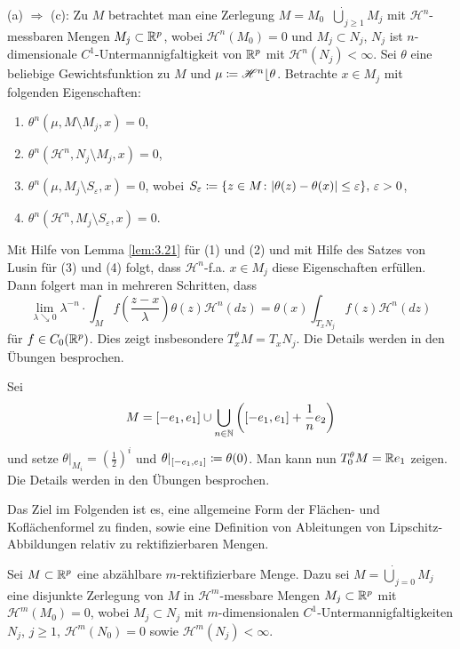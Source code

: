 \documentclass[a4paper,twoside,DIV15,BCOR12mm]{scrbook}
\newcommand{\HM}{\mathscr H}
\DeclareMathOperator{\downto}{\searrow}
\newcommand{\MR}{\lfloor}
\begin{document}
\begin{beweis}[Skizze]
(a) \(\Rightarrow\) (c): Zu \(M\) betrachtet man eine Zerlegung \(M = M_0 \mathop{\dot\cup} {\dot\bigcup}_{j\geq1} M_j\) mit \(\HM^n\)-messbaren Mengen \(M_j \subset \mathbb{R}^p\), wobei \(\HM^n(M_0)=0\) und \(M_j\subset N_j\), \(N_j\) ist \(n\)-dimensionale \(C^1\)-Unter\-mannig\-faltig\-keit von \(\mathbb{R}^p\) mit \(\HM^n(N_j)<\infty\). Sei \(\theta\) eine beliebige Gewichtsfunktion zu \(M\) und \(\mu \da \HM^n \MR \theta\). Betrachte \(x\in M_j\) mit folgenden Eigenschaften:
\begin{enumerate}[(1)]
\item \(\theta^n(\mu, M\setminus M_j, x)=0\),
\item \(\theta^n(\HM^n, N_j \setminus M_j, x) = 0\),
\item \(\theta^n(\mu, M_j \setminus S_\varepsilon, x) = 0\), wobei \(S_\varepsilon \da \{z\in M \colon |\theta(z)-\theta(x)|\leq\varepsilon\},\, \varepsilon>0\),
\item \(\theta^n(\HM^n, M_j\setminus S_\varepsilon, x)=0\).
\end{enumerate}
Mit Hilfe von Lemma \ref{lem:3.21} für (1) und (2) und mit Hilfe des Satzes von Lusin für (3) und (4) folgt, dass \(\HM^n\)-f.a. \(x\in M_j\) diese Eigenschaften erfüllen. Dann folgert man in mehreren Schritten, dass
\[
\lim_{\lambda\downto0} \lambda^{-n} \cdot \int_M f(\frac{z-x}\lambda) \theta(z) \HM^n(dz) = \theta(x) \int_{T_x N_j} f(z) \HM^n(dz)
\]
für \(f \in C_0(\mathbb{R}^p)\). Dies zeigt insbesondere \(T_x^\theta M = T_x N_j\). Die Details werden in den Übungen 
besprochen.
\end{beweis}

\begin{beispiel} Sei
\[M = [-e_1, e_1] \cup \bigcup_{n \in \mathbb{N}} \left( [-e_1, e_1] + \frac1n e_2 \right)
\] und setze \(\theta|_{M_i} = \left(\frac12\right)^i\) und \(\theta|_{[-e_1,e_1]} \da \theta(0)\). Man kann nun \(T_0^\theta M = \mathbb{R} e_1\) zeigen.  Die Details werden in den Übungen besprochen.
\end{beispiel}

\bigskip

Das Ziel im Folgenden ist es, eine allgemeine Form der Flächen- und Koflächenformel zu finden, sowie eine Definition von Ableitungen von Lipschitz-Abbildungen relativ zu rektifizierbaren Mengen.

Sei $M\subset \mathbb{R}^p$ eine abzählbare $m$-rektifizierbare Menge. Dazu sei $M = \dot\bigcup_{j=0} M_j$ eine  disjunkte Zerlegung von $M$ in $\HM^m$-messbare Mengen $M_j\subset\mathbb{R}^p$ mit $\HM^m(M_0)=0$, wobei $M_j\subset N_j$ mit $m$-dimensionalen $C^1$-Untermannigfaltigkeiten $N_j$, $j\ge 1$, $\HM^m(N_0)=0$ sowie $\HM^m(N_j)<\infty$.
\end{document}
